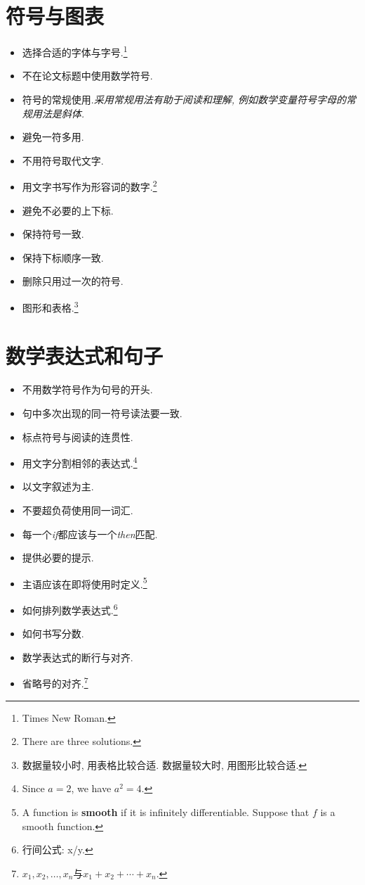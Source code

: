 \documentclass[openany]{ctexbook}
\begin{document}
    \section{符号与图表}
    \begin{itemize}
        \item 选择合适的字体与字号.\footnote{Times New Roman.}
        \item 不在论文标题中使用数学符号.
        \item 符号的常规使用.\emph{采用常规用法有助于阅读和理解, 例如数学变量符号字母的常规用法是斜体.}
        \item 避免一符多用.
        \item 不用符号取代文字.
        \item 用文字书写作为形容词的数字.\footnote{There are three solutions.}
        \item 避免不必要的上下标.
        \item 保持符号一致.
        \item 保持下标顺序一致.
        \item 删除只用过一次的符号.
        \item 图形和表格.\footnote{数据量较小时, 用表格比较合适. 数据量较大时, 用图形比较合适.}
    \end{itemize}

    \section{数学表达式和句子}
    \begin{itemize}
        \item 不用数学符号作为句号的开头.
        \item 句中多次出现的同一符号读法要一致.
        \item 标点符号与阅读的连贯性.
        \item 用文字分割相邻的表达式.\footnote{Since $a=2$, we have $a^2=4$.}
        \item 以文字叙述为主.
        \item 不要超负荷使用同一词汇.
        \item 每一个\emph{if}都应该与一个\emph{then}匹配.
        \item 提供必要的提示.
        \item 主语应该在即将使用时定义.\footnote{A function is \textbf{smooth} if it is infinitely differentiable. Suppose that $f$ is a smooth function.}
        \item 如何排列数学表达式.\footnote{行间公式: x/y.}
        \item 如何书写分数.
        \item 数学表达式的断行与对齐.
        \item 省略号的对齐.\footnote{$x_1,x_2,\ldots,x_n$与$x_1+x_2+\cdots+x_n$.}
    \end{itemize}
\end{document}
